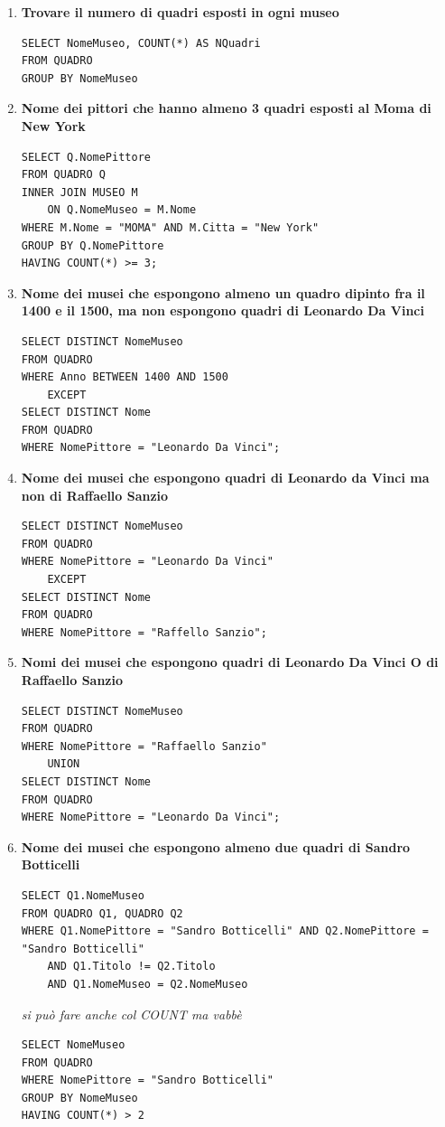 \documentclass{article}
\begin{document}
\begin{enumerate}
\item \textbf{Trovare il numero di quadri esposti in ogni museo}
\begin{lstlisting}[style=sqlstyle]
SELECT NomeMuseo, COUNT(*) AS NQuadri
FROM QUADRO
GROUP BY NomeMuseo
\end{lstlisting}
\item \textbf{Nome dei pittori che hanno almeno 3 quadri esposti al Moma di New York}
\begin{lstlisting}[style=sqlstyle]
SELECT Q.NomePittore
FROM QUADRO Q
INNER JOIN MUSEO M
	ON Q.NomeMuseo = M.Nome
WHERE M.Nome = "MOMA" AND M.Citta = "New York"
GROUP BY Q.NomePittore
HAVING COUNT(*) >= 3;
\end{lstlisting}
\item \textbf{Nome dei musei che espongono almeno un quadro dipinto fra il 1400 e il 1500, ma non espongono quadri di Leonardo Da Vinci}
\begin{lstlisting}[style=sqlstyle]
SELECT DISTINCT NomeMuseo
FROM QUADRO
WHERE Anno BETWEEN 1400 AND 1500
	EXCEPT
SELECT DISTINCT Nome
FROM QUADRO 
WHERE NomePittore = "Leonardo Da Vinci";
\end{lstlisting}
\item \textbf{Nome dei musei che espongono quadri di Leonardo da Vinci ma non di Raffaello Sanzio}
\begin{lstlisting}[style=sqlstyle]
SELECT DISTINCT NomeMuseo
FROM QUADRO 
WHERE NomePittore = "Leonardo Da Vinci"
	EXCEPT
SELECT DISTINCT Nome
FROM QUADRO 
WHERE NomePittore = "Raffello Sanzio";
\end{lstlisting}
\item \textbf{Nomi dei musei che espongono quadri di Leonardo Da Vinci O di Raffaello Sanzio}
\begin{lstlisting}[style=sqlstyle]
SELECT DISTINCT NomeMuseo
FROM QUADRO
WHERE NomePittore = "Raffaello Sanzio"
	UNION
SELECT DISTINCT Nome
FROM QUADRO
WHERE NomePittore = "Leonardo Da Vinci";
\end{lstlisting}

\item \textbf{Nome dei musei che espongono almeno due quadri di Sandro Botticelli}
\begin{lstlisting}[style=sqlstyle]
SELECT Q1.NomeMuseo
FROM QUADRO Q1, QUADRO Q2
WHERE Q1.NomePittore = "Sandro Botticelli" AND Q2.NomePittore = "Sandro Botticelli"
	AND Q1.Titolo != Q2.Titolo
	AND Q1.NomeMuseo = Q2.NomeMuseo
\end{lstlisting}
\textit{si può fare anche col COUNT ma vabbè}
\begin{lstlisting}[style=sqlstyle]
SELECT NomeMuseo
FROM QUADRO
WHERE NomePittore = "Sandro Botticelli"
GROUP BY NomeMuseo
HAVING COUNT(*) > 2
\end{lstlisting}
\end{enumerate}
\end{document}

